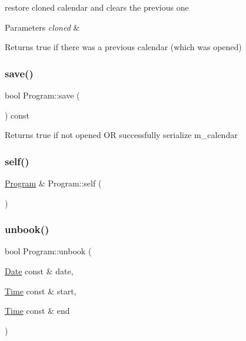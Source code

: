 restore cloned calendar and clears the previous one 
\begin{DoxyParams}{Parameters}
{\em cloned} & \\
\hline
\end{DoxyParams}
\begin{DoxyReturn}{Returns}
true if there was a previous calendar (which was opened) 
\end{DoxyReturn}
\mbox{\label{classProgram_a9ab390cc3caa8cc7dee9704a273a6979}} 
\subsubsection{\texorpdfstring{save()}{save()}}
{\footnotesize\ttfamily bool Program\+::save (\begin{DoxyParamCaption}{ }\end{DoxyParamCaption}) const}

\begin{DoxyReturn}{Returns}
true if not opened OR successfully serialize m\+\_\+calendar 
\end{DoxyReturn}
\mbox{\label{classProgram_a6f703bef529f93987481e04ab6f3014a}} 
\subsubsection{\texorpdfstring{self()}{self()}}
{\footnotesize\ttfamily \hyperlink{classProgram}{Program} \& Program\+::self (\begin{DoxyParamCaption}{ }\end{DoxyParamCaption})\hspace{0.3cm}{\ttfamily [static]}}

\mbox{\label{classProgram_a86a0e7e6c345dd50643cc6f466fb965a}} 
\subsubsection{\texorpdfstring{unbook()}{unbook()}}
{\footnotesize\ttfamily bool Program\+::unbook (\begin{DoxyParamCaption}\item[{\hyperlink{classDate}{Date} const \&}]{date,  }\item[{\hyperlink{classTime}{Time} const \&}]{start,  }\item[{\hyperlink{classTime}{Time} const \&}]{end }\end{DoxyParamCaption})}

